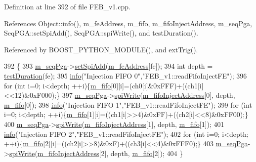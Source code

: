 Definition at line 392 of file F\+E\+B\+\_\+v1.\+cpp.



References Object\+::info(), m\+\_\+fe\+Address, m\+\_\+fifo, m\+\_\+fifo\+Inject\+Address, m\+\_\+seq\+Pga, Seq\+P\+G\+A\+::set\+Spi\+Add(), Seq\+P\+G\+A\+::spi\+Write(), and test\+Duration().



Referenced by B\+O\+O\+S\+T\+\_\+\+P\+Y\+T\+H\+O\+N\+\_\+\+M\+O\+D\+U\+L\+E(), and ext\+Trig().


\begin{DoxyCode}
392                                                                                  \{
393   \hyperlink{classFEB__v1_a6c7804ac86796f233a8393043adf2e77}{m\_seqPga}->\hyperlink{classSeqPGA_ac998ce3a6d9b5f2e88cc8393f8c1df53}{setSpiAdd}(\hyperlink{classFEB__v1_a4e1945c2d5b434125f375e9d0fc6d99f}{m\_feAddress}[fe]);
394   \textcolor{keywordtype}{int} depth = \hyperlink{classFEB__v1_a7f1db8ca9490172fce7603da9e703dec}{testDuration}(fe);
395   \hyperlink{classObject_a644fd329ea4cb85f54fa6846484b84a8}{info}(\textcolor{stringliteral}{"Injection FIFO 0"},\textcolor{stringliteral}{"FEB\_v1::readFifoInjectFE"});        
396   \textcolor{keywordflow}{for} (\textcolor{keywordtype}{int} i=0; i<depth; ++i)\{\hyperlink{classFEB__v1_ae5b770f2f5ffb97324862c93e3153985}{m\_fifo}[0][i]=(ch0[i]&0xFFF)+((ch1[i]<<12)&0xF000);\}
397   \hyperlink{classFEB__v1_a6c7804ac86796f233a8393043adf2e77}{m\_seqPga}->\hyperlink{classSeqPGA_ad4421841ce4ce8b88ad13f63216f0743}{spiWrite}(\hyperlink{classFEB__v1_afd035f292061e1823ed64471bb0228ef}{m\_fifoInjectAddress}[0], depth, 
      \hyperlink{classFEB__v1_ae5b770f2f5ffb97324862c93e3153985}{m\_fifo}[0]);
398   \hyperlink{classObject_a644fd329ea4cb85f54fa6846484b84a8}{info}(\textcolor{stringliteral}{"Injection FIFO 1"},\textcolor{stringliteral}{"FEB\_v1::readFifoInjectFE"});        
399   \textcolor{keywordflow}{for} (\textcolor{keywordtype}{int} i=0; i<depth; ++i)\{\hyperlink{classFEB__v1_ae5b770f2f5ffb97324862c93e3153985}{m\_fifo}[1][i]=((ch1[i]>>4)&0xFF)+((ch2[i]<<8)&0xFF00);\}
400   \hyperlink{classFEB__v1_a6c7804ac86796f233a8393043adf2e77}{m\_seqPga}->\hyperlink{classSeqPGA_ad4421841ce4ce8b88ad13f63216f0743}{spiWrite}(\hyperlink{classFEB__v1_afd035f292061e1823ed64471bb0228ef}{m\_fifoInjectAddress}[1], depth, 
      \hyperlink{classFEB__v1_ae5b770f2f5ffb97324862c93e3153985}{m\_fifo}[1]);
401   \hyperlink{classObject_a644fd329ea4cb85f54fa6846484b84a8}{info}(\textcolor{stringliteral}{"Injection FIFO 2"},\textcolor{stringliteral}{"FEB\_v1::readFifoInjectFE"});        
402   \textcolor{keywordflow}{for} (\textcolor{keywordtype}{int} i=0; i<depth; ++i)\{\hyperlink{classFEB__v1_ae5b770f2f5ffb97324862c93e3153985}{m\_fifo}[2][i]=((ch2[i]>>8)&0xF)+((ch3[i]<<4)&0xFFF0);\}
403   \hyperlink{classFEB__v1_a6c7804ac86796f233a8393043adf2e77}{m\_seqPga}->\hyperlink{classSeqPGA_ad4421841ce4ce8b88ad13f63216f0743}{spiWrite}(\hyperlink{classFEB__v1_afd035f292061e1823ed64471bb0228ef}{m\_fifoInjectAddress}[2], depth, 
      \hyperlink{classFEB__v1_ae5b770f2f5ffb97324862c93e3153985}{m\_fifo}[2]);
404 \}
\end{DoxyCode}
